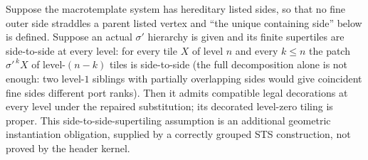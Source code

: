 \begin{theorem}
\label{lem:lift-hierarchy}
Suppose the macrotemplate system has hereditary listed sides, so that no
fine outer side straddles a parent listed vertex and ``the unique
containing side'' below is defined. Suppose an actual $\sigma'$ hierarchy
is given and its finite supertiles
are side-to-side at every level: for every tile $X$ of level $n$ and every
$k\le n$ the patch $\sigma'^{\,k}X$ of level-$(n-k)$ tiles is side-to-side
(the full decomposition alone is not enough: two level-$1$ siblings with
partially overlapping sides would give coincident fine sides different port
ranks). Then it admits compatible legal decorations at every
level under the repaired substitution; its decorated level-zero tiling
is proper. This side-to-side-supertiling assumption is an additional
geometric instantiation obligation, supplied by a correctly grouped STS
construction, not proved by the header kernel.
\end{theorem}
